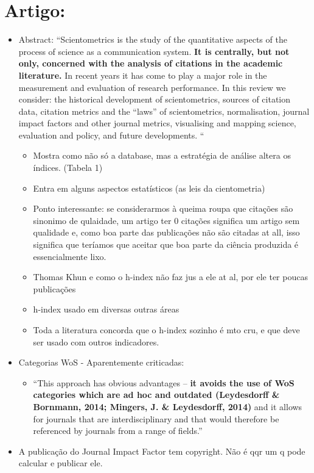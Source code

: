 \documentclass[11pt]{article}
\begin{document}
\section{Artigo: \cite{mingers2015}}
\label{sec:org70ab11c}
\begin{itemize}
\item Abstract: ``Scientometrics is the study of the quantitative aspects of the process of science as a communication system. \textbf{It is centrally, but not only, concerned with the analysis of citations in the academic literature.} In recent years it has come to play a major role in the measurement and evaluation of research performance. In this review we consider: the historical development of scientometrics, sources of citation data, citation metrics and the “laws'' of scientometrics, normalisation, journal impact factors and other journal metrics, visualising and mapping science, evaluation and policy, and future developments. ``
\begin{itemize}
\item Mostra como não só a database, mas a estratégia de análise altera os índices. (Tabela 1)
\item Entra em alguns aspectos estatísticos (as leis da cientometria)
\item Ponto interessante: se considerarmos à queima roupa que citações são sinonimo de qulaidade, um artigo ter 0 citações significa um artigo sem qualidade e, como boa parte das publicações não são citadas at all, isso significa que teríamos que aceitar que boa parte da ciência produzida é essencialmente lixo.
\item Thomas Khun e como o h-index não faz jus a ele at al, por ele ter poucas publicações
\item h-index usado em diversas outras áreas
\item Toda a literatura concorda que o h-index sozinho é mto cru, e que deve ser usado com outros indicadores.
\end{itemize}
\item Categorias WoS - Aparentemente criticadas:
\begin{itemize}
\item ``This approach has obvious advantages – \textbf{it avoids the use of WoS categories which are ad hoc and outdated (Leydesdorff \& Bornmann, 2014; Mingers, J. \& Leydesdorff, 2014)} and it allows for journals that are interdisciplinary and that would therefore be referenced by journals from a range of fields.''
\end{itemize}
\item A publicação do Journal Impact Factor tem copyright. Não é qqr um q pode calcular e publicar ele.

\end{itemize}
\end{document}

